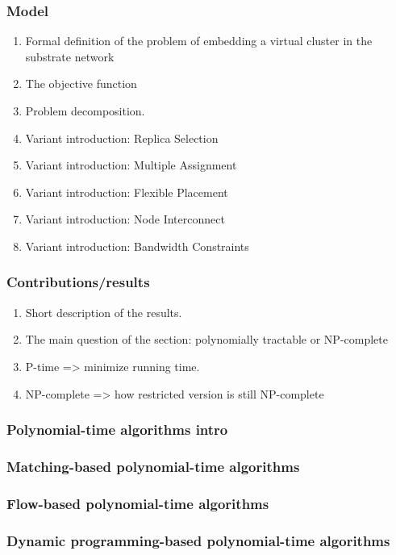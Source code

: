 \documentclass[a4paper]{article}
\begin{document}
\subsubsection{Model}
\begin{enumerate}
  \item Formal definition of the problem of embedding a virtual cluster in the substrate network
  \item The objective function
  \item Problem decomposition.
  \item Variant introduction: Replica Selection
  \item Variant introduction: Multiple Assignment
  \item Variant introduction: Flexible Placement
  \item Variant introduction: Node Interconnect
  \item Variant introduction: Bandwidth Constraints
\end{enumerate}
\subsubsection{Contributions/results}
\begin{enumerate}
  \item Short description of the results.
  \item The main question of the section: polynomially tractable or NP-complete
  \item P-time => minimize running time.
  \item NP-complete => how restricted version is still NP-complete
\end{enumerate}

\subsubsection{Polynomial-time algorithms intro}
\subsubsection{Matching-based polynomial-time algorithms}
\subsubsection{Flow-based polynomial-time algorithms}
\subsubsection{Dynamic programming-based polynomial-time algorithms}
\end{document}
